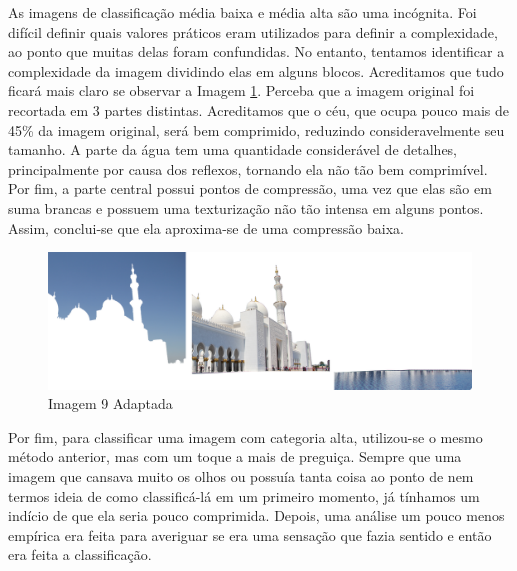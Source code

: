 \hspace{1.5 cm} As imagens de classificação média baixa e média alta são uma incógnita. Foi difícil definir quais valores práticos eram utilizados para definir a complexidade, ao ponto que muitas delas foram confundidas. No entanto, tentamos identificar a complexidade da imagem dividindo elas em alguns blocos. Acreditamos que tudo ficará mais claro se observar a Imagem \ref{fig:imagem_9}. Perceba que a imagem original foi recortada em 3 partes distintas. Acreditamos que o céu, que ocupa pouco mais de 45\% da imagem original, será bem comprimido, reduzindo consideravelmente seu tamanho. A parte da água tem uma quantidade considerável de detalhes, principalmente por causa dos reflexos, tornando ela não tão bem comprimível. Por fim, a parte central possui pontos de compressão, uma vez que elas são em suma brancas e possuem uma texturização não tão intensa em alguns pontos. Assim, conclui-se que ela aproxima-se de uma compressão baixa.

\begin{figure}[H]
    \centering
    
    \caption{Imagem 9 Adaptada}
    \label{fig:imagem_9}
    
    \includegraphics[scale=0.25]{Documeto/1-ElementosTextuais/1-Desenvolvimento/imagens-atividade2/IMG09-corte.png}

\end{figure}

\hspace{1.5 cm} Por fim, para classificar uma imagem com categoria alta, utilizou-se o mesmo método anterior, mas com um toque a mais de preguiça. Sempre que uma imagem que cansava muito os olhos ou possuía tanta coisa ao ponto de nem termos ideia de como classificá-lá em um primeiro momento, já tínhamos um indício de que ela seria pouco comprimida. Depois, uma análise um pouco menos empírica era feita para averiguar se era uma sensação que fazia sentido e então era feita a classificação.
